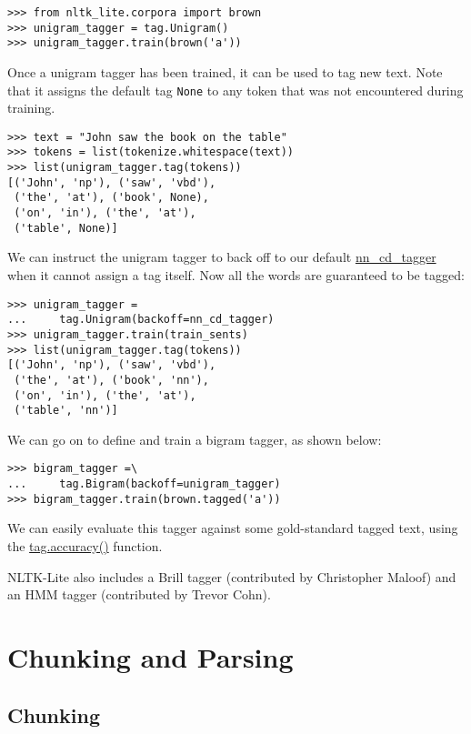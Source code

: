\documentclass[11pt]{article}
\begin{document}
{\small\begin{verbatim}
>>> from nltk_lite.corpora import brown
>>> unigram_tagger = tag.Unigram()
>>> unigram_tagger.train(brown('a'))
\end{verbatim}}
    
\noindent
Once a unigram tagger has been trained, it can be used to tag new text.
Note that it assigns the default tag \texttt{None} to any token that was not
encountered during training.

{\small\begin{verbatim}
>>> text = "John saw the book on the table"
>>> tokens = list(tokenize.whitespace(text))
>>> list(unigram_tagger.tag(tokens))
[('John', 'np'), ('saw', 'vbd'),
 ('the', 'at'), ('book', None),
 ('on', 'in'), ('the', 'at'),
 ('table', None)]
\end{verbatim}}
    
\noindent
We can instruct the unigram tagger to back off to our default
\url{nn_cd_tagger} when it cannot assign a tag itself.  Now all
the words are guaranteed to be tagged:

{\small\begin{verbatim}
>>> unigram_tagger =
...     tag.Unigram(backoff=nn_cd_tagger)
>>> unigram_tagger.train(train_sents)
>>> list(unigram_tagger.tag(tokens))
[('John', 'np'), ('saw', 'vbd'),
 ('the', 'at'), ('book', 'nn'),
 ('on', 'in'), ('the', 'at'),
 ('table', 'nn')]
\end{verbatim}}

\noindent
We can go on to define and train a bigram tagger, as shown below:

{\small\begin{verbatim}
>>> bigram_tagger =\
...     tag.Bigram(backoff=unigram_tagger)
>>> bigram_tagger.train(brown.tagged('a'))
\end{verbatim}}

\noindent
We can easily evaluate this tagger against some gold-standard tagged
text, using the \url{tag.accuracy()} function.

NLTK-Lite also includes a Brill tagger (contributed by Christopher
Maloof) and an HMM tagger (contributed by Trevor Cohn).

\section{Chunking and Parsing}

\subsection{Chunking}
\end{document}
